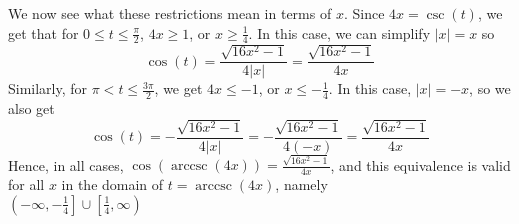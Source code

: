 {\begin{enumerate}
\begin{enumerate}
We now see what these restrictions mean in terms of $x$.  Since $4x = \csc(t)$, we get that for $0 \leq t \leq \frac{\pi}{2}$, $4x \geq 1$, or $x \geq \frac{1}{4}$.  In this case, we can simplify $|x| = x$ so 
\[
\cos(t) = \frac{\sqrt{16x^2-1}}{4|x|} = \frac{\sqrt{16x^2-1}}{4x}
\]  
Similarly, for $\pi < t \leq \frac{3\pi}{2}$, we get $4x \leq -1$, or $x \leq -\frac{1}{4}$.  In this case, $|x| = -x$, so we also get 
\[
\cos(t) = -\frac{\sqrt{16x^2-1}}{4|x|}  = -\frac{\sqrt{16x^2-1}}{4(-x)} =  \frac{\sqrt{16x^2-1}}{4x}
\]  
Hence, in all cases, $\cos(\operatorname{arccsc}(4x)) =  \frac{\sqrt{16x^2-1}}{4x}$, and this equivalence is valid for all $x$ in the domain of $t = \operatorname{arccsc}(4x)$, namely \\$\left(-\infty, -\frac{1}{4}\right] \cup \left[ \frac{1}{4}, \infty \right)$  

\end{enumerate}

\end{enumerate}
}





